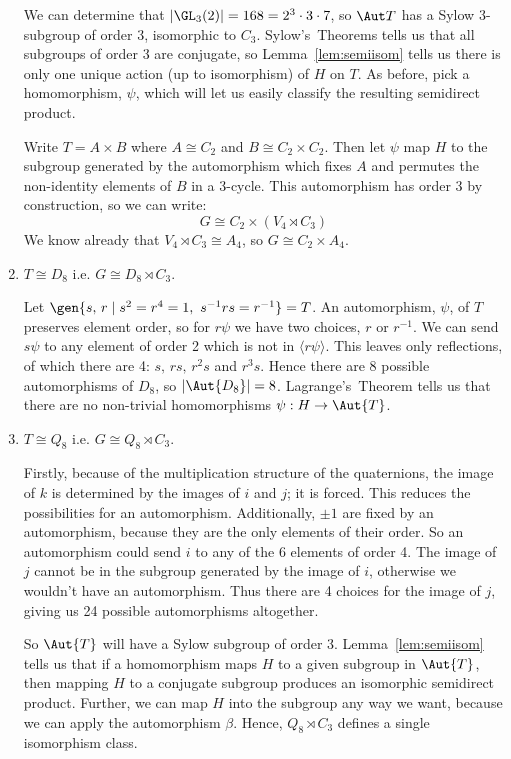 \begin{enumerate}
        We can determine that \(|\GL_3(2)| = 168 = 2^3 \cdot 3 \cdot 7\), so \(\Aut T\) has a Sylow 3-subgroup of order
        3, isomorphic to \(C_3\).
        Sylow's~Theorems tells us that all subgroups of order 3 are conjugate, so Lemma~\ref{lem:semiisom} tells us
        there is only one unique action (up to isomorphism) of \(H\) on \(T\).
        As before, pick a homomorphism, \(\psi\), which will let us easily classify the resulting semidirect product.

        Write \(T = A \times B\) where \(A \cong C_2\) and \(B \cong C_2 \times C_2\).
        Then let \(\psi\) map \(H\) to the subgroup generated by the automorphism which fixes \(A\) and permutes the
        non-identity elements of \(B\) in a 3-cycle.
        This automorphism has order 3 by construction, so we can write:
        \[G \cong C_2 \times (V_4 \rtimes C_3)\]
        We know already that \(V_4 \rtimes C_3 \cong A_4\), so \(G \cong C_2 \times A_4\).
    \item \(T \cong D_8\) i.e. \(G \cong D_8 \rtimes C_3\).

        Let \(\gen{s,\,r \mid s^2 = r^4 = 1,\ s^{-1}rs = r^{-1}} = T\).
        An automorphism, \(\psi\), of \(T\) preserves element order, so for \(r\psi\) we have two choices, \(r\) or
        \(r^{-1}\).
        We can send \(s\psi\) to any element of order 2 which is not in \(\langle r\psi \rangle\).
        This leaves only reflections, of which there are 4: \(s,\,rs,\,r^2s\) and \(r^3s\).
        Hence there are 8 possible automorphisms of \(D_8\), so \(|\Aut{D_8}| = 8\).
        Lagrange's~Theorem tells us that there are no non-trivial homomorphisms \(\psi:H \to \Aut{T}\).
    \item \(T \cong Q_8\) i.e. \(G \cong Q_8 \rtimes C_3\).

        Firstly, because of the multiplication structure of the quaternions, the image of \(k\) is determined by the
        images of \(i\) and \(j\); it is forced.
        This reduces the possibilities for an automorphism.
        Additionally, \(\pm 1\) are fixed by an automorphism, because they are the only elements of their order.
        So an automorphism could send \(i\) to any of the 6 elements of order 4.
        The image of \(j\) cannot be in the subgroup generated by the image of \(i\), otherwise we wouldn't have an
        automorphism.
        Thus there are 4 choices for the image of \(j\), giving us 24 possible automorphisms altogether.

        So \(\Aut{T}\) will have a Sylow subgroup of order 3.
        Lemma~\ref{lem:semiisom} tells us that if a homomorphism maps \(H\) to a given subgroup in \(\Aut{T}\), then
        mapping \(H\) to a conjugate subgroup produces an isomorphic semidirect product.
        Further, we can map \(H\) into the subgroup any way we want, because we can apply the automorphism \(\beta\).
        Hence, \(Q_8 \rtimes C_3\) defines a single isomorphism class.


\end{enumerate}
